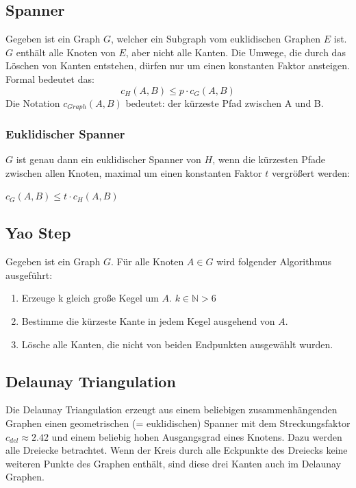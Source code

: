\documentclass[a4paper,twoside]{IEEEtran}
\begin{document}
\subsection{Spanner}
Gegeben ist ein Graph $G $, welcher ein Subgraph vom euklidischen Graphen $E $ ist. $G $ enthält alle Knoten von $E $, aber nicht alle Kanten. Die Umwege, die durch das Löschen von Kanten entstehen, dürfen nur um einen konstanten Faktor ansteigen. Formal bedeutet das:
\begin{equation}
	c_H(A, B) \leq p \cdot c_G(A, B)
\end{equation}
Die Notation $c_{Graph}(A, B) $ bedeutet: der kürzeste Pfad zwischen A und B.

\subsubsection{Euklidischer Spanner}
$G $ ist genau dann ein euklidischer Spanner von $H $, wenn die kürzesten Pfade zwischen allen Knoten, maximal um einen konstanten Faktor $t $ vergrößert werden:

$c_G(A,B) \leq t \cdot c_H(A,B) $

\subsection{Yao Step}
Gegeben ist ein Graph $G $. Für alle Knoten $A \in G $ wird folgender Algorithmus ausgeführt:
\begin{enumerate}
\item Erzeuge k gleich große Kegel um $A $. $k \in \mathds{N} > 6 $
\item Bestimme die kürzeste Kante in jedem Kegel ausgehend von $A $.
\item Lösche alle Kanten, die nicht von beiden Endpunkten ausgewählt wurden.

\end{enumerate} 

\subsection{Delaunay Triangulation}
Die Delaunay Triangulation erzeugt aus einem beliebigen zusammenhängenden Graphen einen geometrischen (= euklidischen) Spanner mit dem Streckungsfaktor $c_{del} \approx 2.42 $ und einem beliebig hohen Ausgangsgrad eines Knotens. Dazu werden alle Dreiecke betrachtet. Wenn der Kreis durch alle Eckpunkte des Dreiecks keine weiteren Punkte des Graphen enthält, sind diese drei Kanten auch im Delaunay Graphen. 
\end{document}
